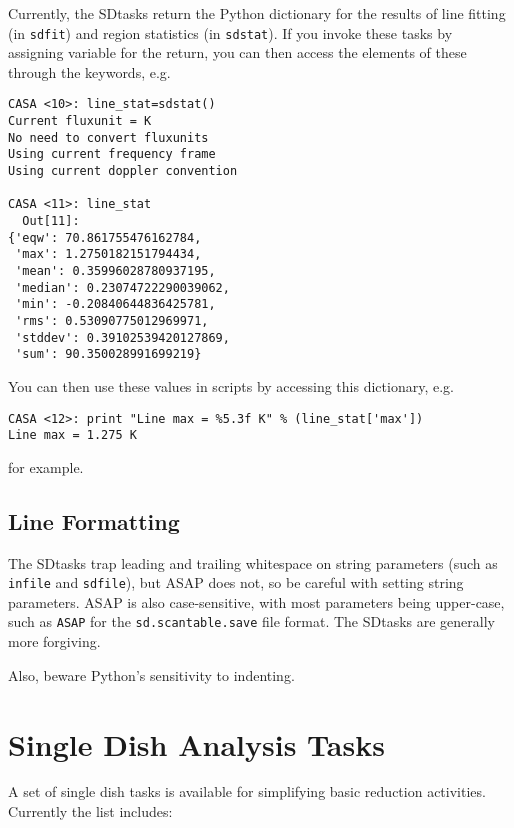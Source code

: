 Currently, the SDtasks return the Python dictionary 
for the results of line fitting (in {\tt sdfit})
and region statistics (in {\tt sdstat}). If you invoke
these tasks by assigning variable for the return,
you can then access the
elements of these through the keywords, e.g.
\small
\begin{verbatim}
CASA <10>: line_stat=sdstat()
Current fluxunit = K
No need to convert fluxunits
Using current frequency frame
Using current doppler convention

CASA <11>: line_stat
  Out[11]: 
{'eqw': 70.861755476162784,
 'max': 1.2750182151794434,
 'mean': 0.35996028780937195,
 'median': 0.23074722290039062,
 'min': -0.20840644836425781,
 'rms': 0.53090775012969971,
 'stddev': 0.39102539420127869,
 'sum': 90.350028991699219}
\end{verbatim}
\normalsize
You can then use these values in scripts by accessing this dictionary,
e.g.
\small
\begin{verbatim}
CASA <12>: print "Line max = %5.3f K" % (line_stat['max'])
Line max = 1.275 K
\end{verbatim}
\normalsize
for example.

\subsection{Line Formatting}
\label{section:sd.intro.line}

The SDtasks trap leading and trailing whitespace on string parameters
(such as {\tt infile} and {\tt sdfile}), but ASAP does not, so be
careful with setting string parameters.  ASAP is also case-sensitive,
with most parameters being upper-case, such as {\tt ASAP} for the
{\tt sd.scantable.save} file format.  The SDtasks are generally
more forgiving.

Also, beware Python's sensitivity to indenting.

\section{Single Dish Analysis Tasks}
\label{section:sd.sdtasks}

A set of single dish tasks is available for simplifying basic
reduction activities. Currently the list includes:

